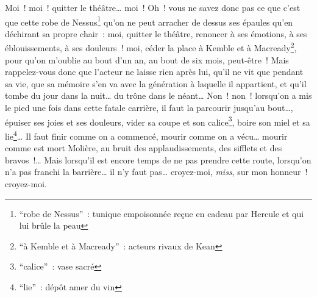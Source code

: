 {Moi~! moi~! quitter le théâtre… moi~! Oh~! vous ne savez donc pas ce
que c'est que cette robe de Nessus\footnote{“robe de Nessus”~:
tunique empoisonnée reçue en cadeau par Hercule et qui lui brûle la
peau} qu'on ne peut arracher de dessus ses épaules qu'en déchirant sa
propre chair~: moi, quitter le théâtre, renoncer à ses émotions, à
ses éblouissements, à ses douleurs~! moi, céder la place à Kemble et
à Macready\footnote{“à Kemble et à Macready”~: acteurs rivaux de
Kean}, pour qu'on m'oublie au bout d'un an, au bout de six mois,
peut-être~! Mais rappelez-vous donc que l'acteur ne laisse rien après
lui, qu'il ne vit que pendant sa vie, que sa mémoire s'en va avec la
génération à laquelle il appartient, et qu'il tombe du jour dans la
nuit… du trône dans le néant… Non~! non~! lorsqu'on a mis le pied une
fois dans cette fatale carrière, il faut la parcourir jusqu'au bout…,
épuiser ses joies et ses douleurs, vider sa coupe et son
calice\footnote{“calice”~: vase sacré}, boire son miel et sa
lie\footnote{“lie”~: dépôt amer du vin}… Il faut finir comme on a
commencé, mourir comme on a vécu… mourir comme est mort Molière, au
bruit des applaudissements, des sifflets et des bravos~!… Mais
lorsqu'il est encore temps de ne pas prendre cette route, lorsqu'on
n'a pas franchi la barrière… il n'y faut pas… croyez-moi,
\textit{miss}, sur mon honneur~! croyez-moi.
}

